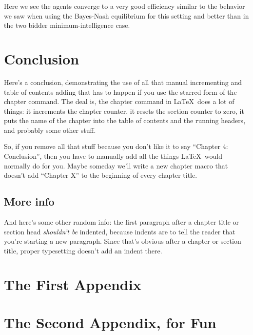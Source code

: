 \documentclass[12pt,twoside]{reedthesis}
\begin{document}
Here we see the agents converge to a very good efficiency similar to the behavior we saw when using the Bayes-Nash equilibrium for this setting and better than in the two bidder minimum-intelligence case.


\chapter*{Conclusion}
	\setcounter{chapter}{4}
	\setcounter{section}{0}
	
Here's a conclusion, demonstrating the use of all that manual incrementing and table of contents adding that has to happen if you use the starred form of the chapter command. The deal is, the chapter command in \LaTeX\ does a lot of things: it increments the chapter counter, it resets the section counter to zero, it puts the name of the chapter into the table of contents and the running headers, and probably some other stuff. 

So, if you remove all that stuff because you don't like it to say ``Chapter 4: Conclusion'', then you have to manually add all the things \LaTeX\ would normally do for you. Maybe someday we'll write a new chapter macro that doesn't add ``Chapter X'' to the beginning of every chapter title.

\section{More info}
And here's some other random info: the first paragraph after a chapter title or section head \emph{shouldn't be} indented, because indents are to tell the reader that you're starting a new paragraph. Since that's obvious after a chapter or section title, proper typesetting doesn't add an indent there. 


    \appendix
      \chapter{The First Appendix}
      \chapter{The Second Appendix, for Fun}


\end{document}
